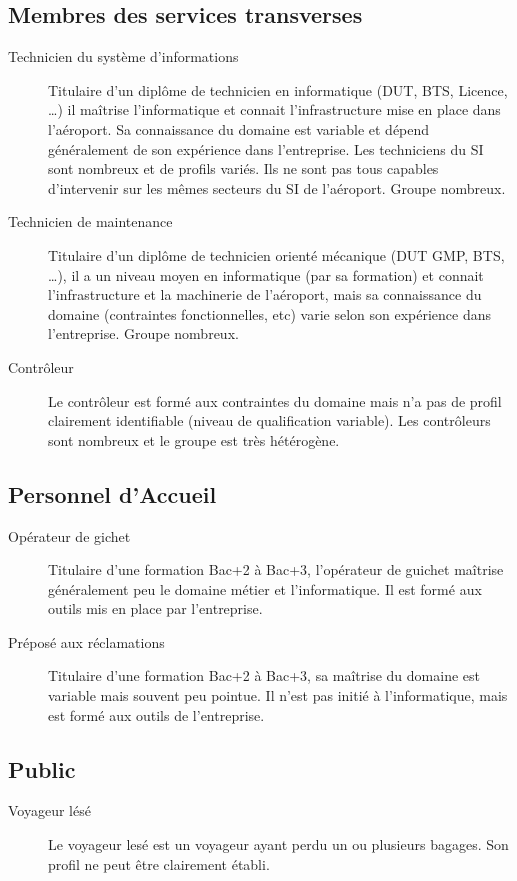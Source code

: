 \documentclass{article}
\begin{document}
\subsection{Membres des services transverses}
\begin{description}
\item[Technicien du système d'informations] Titulaire d'un diplôme de technicien
en informatique (DUT, BTS, Licence, \ldots) il maîtrise l'informatique et
connait l'infrastructure mise en place dans l'aéroport. Sa connaissance du
domaine est variable et dépend généralement de son expérience dans l'entreprise.
Les techniciens du SI sont nombreux et de profils variés. Ils ne sont pas tous
capables d'intervenir sur les mêmes secteurs du SI de l'aéroport. Groupe
nombreux.
\item[Technicien de maintenance] Titulaire d'un diplôme de technicien orienté
mécanique (DUT GMP, BTS, \ldots), il a un niveau moyen en informatique (par sa
formation) et connait l'infrastructure et la machinerie de l'aéroport, mais sa
connaissance du domaine (contraintes fonctionnelles, etc) varie selon son
expérience dans l'entreprise. Groupe nombreux. 
\item[Contrôleur] Le contrôleur est formé aux contraintes du domaine mais n'a
pas de profil clairement identifiable (niveau de qualification variable). Les
contrôleurs sont nombreux et le groupe est très hétérogène.
\end{description}

\subsection{Personnel d'Accueil}
\begin{description}
\item[Opérateur de gichet] Titulaire d'une formation Bac+2 à Bac+3, l'opérateur
de guichet maîtrise généralement peu le domaine métier et l'informatique. Il est
formé aux outils mis en place par l'entreprise.
\item[Préposé aux réclamations] Titulaire d'une formation Bac+2 à Bac+3, sa
maîtrise du domaine est variable mais souvent peu pointue. Il n'est pas initié à
l'informatique, mais est formé aux outils de l'entreprise.
\end{description}

\subsection{Public}
\begin{description}
\item[Voyageur lésé] Le voyageur lesé est un voyageur ayant perdu un ou
plusieurs bagages. Son profil ne peut être clairement établi.
\end{description}
\end{document}
